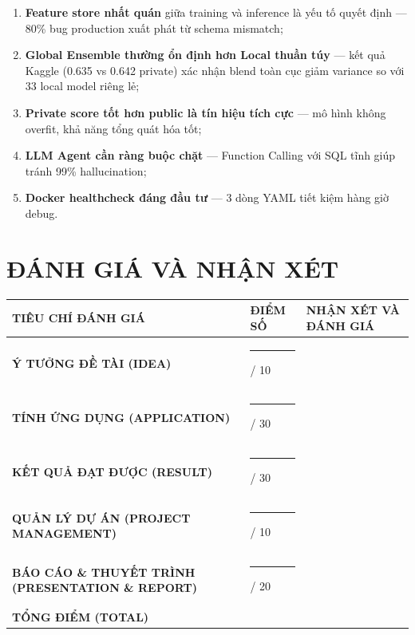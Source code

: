 \documentclass[12pt,a4paper]{report}
\begin{document}
\begin{enumerate}
    \item \textbf{Feature store nhất quán} giữa training và inference là yếu tố quyết định --- 80\% bug production xuất phát từ schema mismatch;
    
    \item \textbf{Global Ensemble thường ổn định hơn Local thuần túy} --- kết quả Kaggle (0.635 vs 0.642 private) xác nhận blend toàn cục giảm variance so với 33 local model riêng lẻ;
    
    \item \textbf{Private score tốt hơn public là tín hiệu tích cực} --- mô hình không overfit, khả năng tổng quát hóa tốt;
    
    \item \textbf{LLM Agent cần ràng buộc chặt} --- Function Calling với SQL tĩnh giúp tránh 99\% hallucination;
    
    \item \textbf{Docker healthcheck đáng đầu tư} --- 3 dòng YAML tiết kiệm hàng giờ debug.
\end{enumerate}

\cleardoublepage

\chapter*{ĐÁNH GIÁ VÀ NHẬN XÉT}
\vspace{1cm}


\vspace{0.4cm}

\renewcommand{\arraystretch}{1.6}
\begin{tabularx}{\textwidth}{|>{\bfseries}p{5.5cm}|>{\centering\arraybackslash}p{2.5cm}|X|}
\hline
\rowcolor{lightgraybg}
\textbf{TIÊU CHÍ ĐÁNH GIÁ} & \textbf{ĐIỂM SỐ} & \textbf{NHẬN XÉT VÀ ĐÁNH GIÁ} \\
\hline
Ý TƯỞNG ĐỀ TÀI (IDEA) & \rule{8mm}{0.4pt} / 10 & \\[0.8cm]
\hline
TÍNH ỨNG DỤNG (APPLICATION) & \rule{8mm}{0.4pt} / 30 & \\[0.8cm]
\hline
KẾT QUẢ ĐẠT ĐƯỢC (RESULT) & \rule{8mm}{0.4pt} / 30 & \\[0.8cm]
\hline
QUẢN LÝ DỰ ÁN (PROJECT MANAGEMENT) & \rule{8mm}{0.4pt} / 10 & \\[0.8cm]
\hline
BÁO CÁO \& THUYẾT TRÌNH (PRESENTATION \& REPORT) & \rule{8mm}{0.4pt} / 20 & \\[0.8cm]
\hline
\rowcolor{lightgraybg}
\textbf{TỔNG ĐIỂM (TOTAL)} & \textbf{\rule{8mm}{0.4pt} / 100} & \\[0.8cm]
\hline
\end{tabularx}
\end{document}
